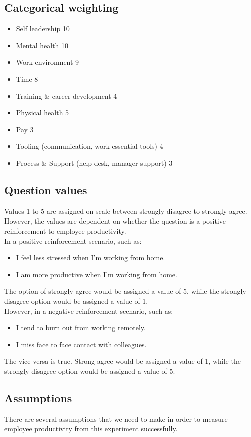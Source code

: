 \documentclass[12pt]{article}
\begin{document}
\subsection*{Categorical weighting}
\begin{itemize}
  \item Self leadership 10
  \item Mental health 10
  \item Work environment 9
  \item Time 8
  \item Training & career development 4
  \item Physical health 5
  \item Pay 3
  \item Tooling (communication, work essential tools) 4 
  \item Process & Support (help desk, manager support) 3
\end{itemize}

\subsection*{Question values}
Values 1 to 5 are assigned on scale between strongly disagree to strongly agree. However, the values are dependent on whether the question is a positive reinforcement to employee productivity. \\
In a positive reinforcement scenario, such as: 
\begin{itemize}
  \item I feel less stressed when I’m working from home. 
  \item I am more productive when I’m working from home. 
\end{itemize}
The option of strongly agree would be assigned a value of 5, while the strongly disagree option would be assigned a value of 1. \\
However, in a negative reinforcement scenario, such as: 
\begin{itemize}
  \item I tend to burn out from working remotely.
  \item I miss face to face contact with colleagues.
\end{itemize}
The vice versa is true. Strong agree would be assigned a value of 1, while the strongly disagree option would be assigned a value of 5.

\subsection*{Assumptions}
There are several assumptions that we need to make in order to measure employee productivity from this experiment successfully.
\end{document}
